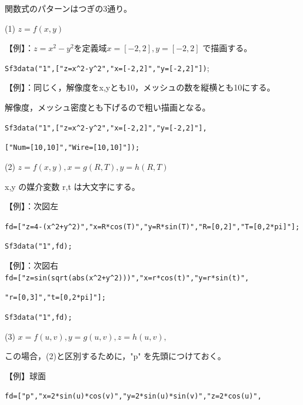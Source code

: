 \documentclass[papersize,a4paper,12pt,uplatex]{jsarticle}
\begin{document}
\begin{description}
 \begin{center}  \end{center}

\vspace{\baselineskip}
関数式のパターンはつぎの3通り。

\vspace{\baselineskip}
(1) $z=f(x,y)$

 【例】：$z=x^2-y^2$を定義域$x=[-2,2],y=[-2,2]$ で描画する。
  
  \verb|Sf3data("1",["z=x^2-y^2","x=[-2,2]","y=[-2,2]"])|;
      
  \begin{center}  \end{center}

 【例】：同じく，解像度をx,yとも10，メッシュの数を縦横とも10にする。
 
 解像度，メッシュ密度とも下げるので粗い描画となる。
   
\verb|Sf3data("1",["z=x^2-y^2","x=[-2,2]","y=[-2,2]"],|
      
\verb|["Num=[10,10]","Wire=[10,10]"]);|
  
\vspace{\baselineskip}
(2) $z=f(x,y),x=g(R,T),y=h(R,T)$

 x,y の媒介変数 r,t は大文字にする。
    
\vspace{\baselineskip}
【例】：次図左
  
\verb|fd=["z=4-(x^2+y^2)","x=R*cos(T)","y=R*sin(T)","R=[0,2]","T=[0,2*pi]"];|

 \verb|Sf3data("1",fd);|
    
【例】：次図右\\
 \verb|fd=["z=sin(sqrt(abs(x^2+y^2)))","x=r*cos(t)","y=r*sin(t)",|

\verb|"r=[0,3]","t=[0,2*pi]"];|
 
\verb|Sf3data("1",fd);|

  \begin{center}     \end{center}

(3) $x=f(u,v),y=g(u,v),z=h(u,v),$

  この場合，(2)と区別するために，"p" を先頭につけておく。
  
 \vspace{\baselineskip}
 【例】球面
 
 \verb|fd=["p","x=2*sin(u)*cos(v)","y=2*sin(u)*sin(v)","z=2*cos(u)",|
    

\end{description}
\end{document}
